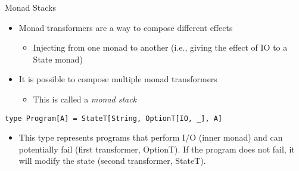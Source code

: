 \documentclass[presentation, 10pt]{beamer}\mode<presentation>{\usetheme{AMSBolognaFC}}
\begin{document}
\begin{frame}[fragile]{Monad Stacks}
\begin{itemize}
	\item Monad transformers are a way to compose different effects
	\begin{itemize}
		\item Injecting from one monad to another (i.e., giving the effect of IO to a State monad)
	\end{itemize}
	\item It is possible to compose multiple monad transformers
	\begin{itemize}
		\item This is called a \emph{monad stack}
	\end{itemize}
\end{itemize}
\begin{tcolorbox}
\begin{verbatim}
type Program[A] = StateT[String, OptionT[IO, _], A]
\end{verbatim}
\end{tcolorbox}

\begin{itemize}
	\item This type represents programs that perform I/O (inner monad) and can potentially fail (first transformer, OptionT). If the program does not fail, it will modify the state (second transformer, StateT).
\end{itemize}
\end{frame}
\end{document}
